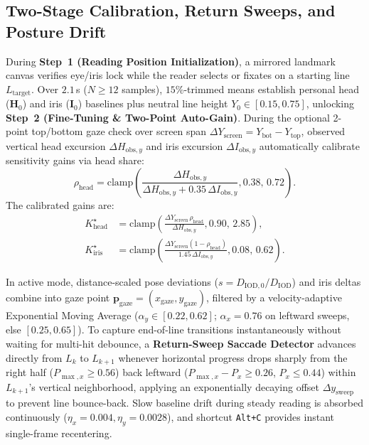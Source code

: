 \documentclass[conference]{IEEEtran}
\begin{document}
\subsection{Two-Stage Calibration, Return Sweeps, and Posture Drift}
During \textbf{Step~1 (Reading Position Initialization)}, a mirrored landmark canvas verifies eye/iris lock while the reader selects or fixates on a starting line $L_{\text{target}}$. Over $2.1$\,s ($N \ge 12$ samples), $15\%$-trimmed means establish personal head ($\mathbf{H}_0$) and iris ($\mathbf{I}_0$) baselines plus neutral line height $Y_0 \in [0.15, 0.75]$, unlocking \textbf{Step~2 (Fine-Tuning \& Two-Point Auto-Gain)}. During the optional 2-point top/bottom gaze check over screen span $\Delta Y_{\text{screen}} = Y_{\text{bot}} - Y_{\text{top}}$, observed vertical head excursion $\Delta H_{\text{obs},y}$ and iris excursion $\Delta I_{\text{obs},y}$ automatically calibrate sensitivity gains via head share:
\begin{equation}
    \rho_{\text{head}} =
    \text{clamp}\!\left(
    \frac{\Delta H_{\text{obs},y}}
         {\Delta H_{\text{obs},y}+0.35\,\Delta I_{\text{obs},y}},
    0.38,\,0.72\right).
\end{equation}
The calibrated gains are:
\begin{equation}
\begin{aligned}
    K_{\text{head}}^{\star}
        &= \text{clamp}\!\left(
        \frac{\Delta Y_{\text{screen}}\,\rho_{\text{head}}}
             {\Delta H_{\text{obs},y}},
        0.90,\,2.85\right), \\
    K_{\text{iris}}^{\star}
        &= \text{clamp}\!\left(
        \frac{\Delta Y_{\text{screen}}(1-\rho_{\text{head}})}
             {1.45\,\Delta I_{\text{obs},y}},
        0.08,\,0.62\right).
\end{aligned}
\end{equation}

In active mode, distance-scaled pose deviations ($s = D_{\text{IOD},0}/D_{\text{IOD}}$) and iris deltas combine into gaze point $\mathbf{p}_{\text{gaze}} = (x_{\text{gaze}}, y_{\text{gaze}})$, filtered by a velocity-adaptive Exponential Moving Average ($\alpha_y \in [0.22, 0.62]$; $\alpha_x = 0.76$ on leftward sweeps, else $[0.25, 0.65]$). To capture end-of-line transitions instantaneously without waiting for multi-hit debounce, a \textbf{Return-Sweep Saccade Detector} advances directly from $L_k$ to $L_{k+1}$ whenever horizontal progress drops sharply from the right half ($P_{\max,x} \ge 0.56$) back leftward ($P_{\max,x} - P_x \ge 0.26$, $P_x \le 0.44$) within $L_{k+1}$'s vertical neighborhood, applying an exponentially decaying offset $\Delta y_{\text{sweep}}$ to prevent line bounce-back. Slow baseline drift during steady reading is absorbed continuously ($\eta_x = 0.004, \eta_y = 0.0028$), and shortcut \texttt{Alt+C} provides instant single-frame recentering.
\end{document}

